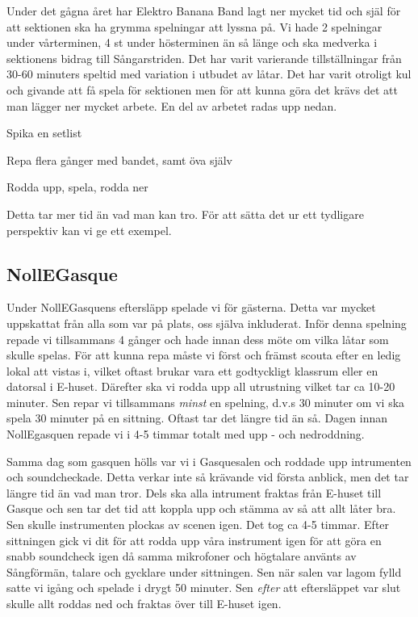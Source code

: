 \documentclass[../_main/handlingar.tex]{subfiles}
\begin{document}
Under det gågna året har Elektro Banana Band lagt ner mycket tid och själ för att sektionen ska ha grymma spelningar att lyssna på. Vi hade 2 spelningar under vårterminen, 4 st under hösterminen än så länge och ska medverka i sektionens bidrag till Sångarstriden. Det har varit varierande tillställningar från 30-60 minuters speltid med variation i utbudet av låtar. Det har varit otroligt kul och givande att få spela för sektionen men för att kunna göra det krävs det att man lägger ner mycket arbete. En del av arbetet radas upp nedan.
\begin{itemizedash}
    \item Spika en setlist
    \item Repa flera gånger med bandet, samt öva själv
    \item Rodda upp, spela, rodda ner
\end{itemizedash}

Detta tar mer tid än vad man kan tro. För att sätta det ur ett tydligare perspektiv kan vi ge ett exempel.
\subsection*{NollEGasque}
Under NollEGasquens eftersläpp spelade vi för gästerna. Detta var mycket uppskattat från alla som var på plats, oss själva inkluderat.
Inför denna spelning repade vi tillsammans 4 gånger och hade innan dess möte om vilka låtar som skulle spelas. För att kunna repa måste vi först och främst scouta efter en ledig lokal att vistas i, vilket oftast brukar vara ett godtyckligt klassrum eller en datorsal i E-huset. Därefter ska vi rodda upp all utrustning vilket tar ca 10-20 minuter. Sen repar vi tillsammans \textit{minst} en spelning, d.v.s 30 minuter om vi ska spela 30 minuter på en sittning. Oftast tar det längre tid än så. Dagen innan NollEgasquen repade vi i 4-5 timmar totalt med upp - och nedroddning.  

Samma dag som gasquen hölls var vi i Gasquesalen och roddade upp intrumenten och soundcheckade. Detta verkar inte så krävande vid första anblick, men det tar längre tid än vad man tror. Dels ska alla intrument fraktas från E-huset till Gasque och sen tar det tid att koppla upp och stämma av så att allt låter bra. Sen skulle instrumenten plockas av scenen igen. Det tog ca 4-5 timmar.
Efter sittningen gick vi dit för att rodda upp våra instrument igen för att göra en snabb soundcheck igen då samma mikrofoner och högtalare använts av Sångförmän, talare och gycklare under sittningen. Sen när salen var lagom fylld satte vi igång och spelade i drygt 50 minuter. Sen \textit{efter} att eftersläppet var slut skulle allt roddas ned och fraktas över till E-huset igen.
\end{document}
